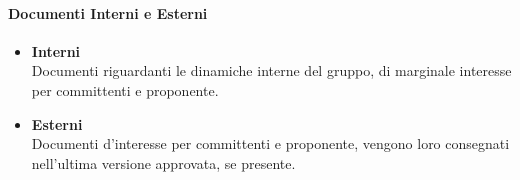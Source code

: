             \paragraph{Documenti Interni e Esterni}
                \begin{itemize}
                    \item\textbf{Interni}\\
                        Documenti riguardanti le dinamiche interne del gruppo, di marginale interesse per committenti e proponente.

                    \item\textbf{Esterni}\\
                        Documenti d’interesse per committenti e proponente, vengono loro consegnati nell’ultima versione approvata, se presente. 
                \end{itemize}            
